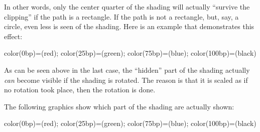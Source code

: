 \begin{command}{\pgfshadepath{}}
    In other words, only the center quarter of the shading will actually
    ``survive the clipping'' if the path is a rectangle. If the path is not a
    rectangle, but, say, a circle, even less is seen of the shading. Here is an
    example that demonstrates this effect:
\begin{codeexample}[]
 {color(0bp)=(red); color(25bp)=(green);  color(75bp)=(blue);  color(100bp)=(black)}
\hskip 1cm
\begin{pgfpicture}
  \pgfpathrectangle{\pgfpointorigin}{\pgfpoint{2cm}{1cm}}
  \pgfpathrectangle{\pgfpoint{3cm}{0cm}}{\pgfpoint{1cm}{2cm}}
  \pgfpathrectangle{\pgfpoint{5cm}{0cm}}{\pgfpoint{2cm}{2cm}}
  \pgfpathcircle{\pgfpoint{9cm}{1cm}}{1cm}
\end{pgfpicture}
\end{codeexample}

    As can be seen above in the last case, the ``hidden'' part of the shading
    actually \emph{can} become visible if the shading is rotated. The reason is
    that it is scaled as if no rotation took place, then the rotation is done.

    The following graphics show which part of the shading are actually shown:
\begin{codeexample}[]
 {color(0bp)=(red); color(25bp)=(green);  color(75bp)=(blue);  color(100bp)=(black)}
\end{codeexample}


\end{command}
